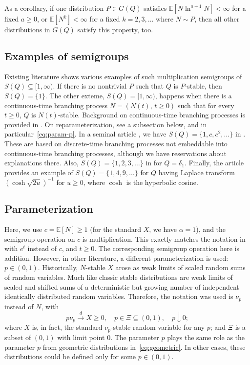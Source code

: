 \documentclass[12pt]{amsart}
\theoremstyle{remark}
\theoremstyle{definition}
\begin{document}
As a corollary, if one distribution $P \in G(Q)$ satisfies $\mathbb E[N\ln^{a+1}N] < \infty$ for a fixed $a \ge 0$, or $\mathbb E[N^k] < \infty$ for a fixed $k = 2, 3, \ldots$ where $N \sim P$, then all other distributions in $G(Q)$ satisfy this property, too. 

\subsection{Examples of semigroups} Existing literature shows various examples of such multiplication semigroups of $S(Q) \subseteq [1, \infty)$. If there is no nontrivial $P$ such that $Q$ is $P$-stable, then $S(Q) = \{1\}$. The other exteme, $S(Q) = [1, \infty)$, happens when there is a continuous-time branching process $N = (N(t),\, t \ge 0)$ such that for every $t \ge 0$, $Q$ is $N(t)$-stable. Background on continuous-time branching processes is provided in \cite[Chapter V]{Harris}. On reparameterization, see a subsection below, and in particular~\eqref{eq:param-p}. In a seminal article \cite{Bunge}, we have $S(Q) = \{1, c, c^2, \ldots\}$ in  \cite[Examples 2, 4]{Bunge}. These are based on discrete-time branching processes not embeddable into continuous-time branching processes, although we have reservations about explanations there. Also, $S(Q) = \{1, 2, 3, \ldots\}$ in \cite[Example 3]{Bunge} for $Q = \delta_1$. Finally, the article \cite{Klebanov} provides an example of $S(Q) = \{1, 4, 9, \ldots\}$ for $Q$ having Laplace transform $(\cosh\sqrt{2u})^{-1}$ for $u \ge 0$, where $\cosh$ is the hyperbolic cosine. 


\subsection{Parameterization} Here, we use $c = \mathbb E[N] \ge 1$ (for the standard $X$, we have $\alpha = 1$), and the semigroup operation on $c$ is multiplication. This exactly matches the notation in \cite{Bunge} with $e^t$ instead of $c$, and $t \ge 0$. The corresponding semigroup operation here is addition. However, in other literature, a different parameterization is used: $p \in (0, 1)$. Historically, $N$-stable $X$ arose as weak limits of scaled random sums of random variables. Much like classic stable distributions are weak limits of scaled and shifted sums of a deterministic but growing number of independent identically distributed random variables. Therefore, the notation was used is $\nu_p$ instead of $N$, with 
\begin{equation}
\label{eq:param-p}
p\nu_p \stackrel{d}{\to} X \ge 0,\quad p \in \Xi \subseteq (0, 1),\quad p \downarrow 0;
\end{equation}
where $X$ is, in fact, the standard $\nu_p$-stable random variable for any $p$; and $\Xi$ is a subset of $(0, 1)$ with limit point $0$. The parameter $p$ plays the same role as the parameter $p$ from geometric distributions in~\eqref{eq:geometric}. In other cases, these distributions could be defined only for some $p \in (0, 1)$. 
\end{document}
